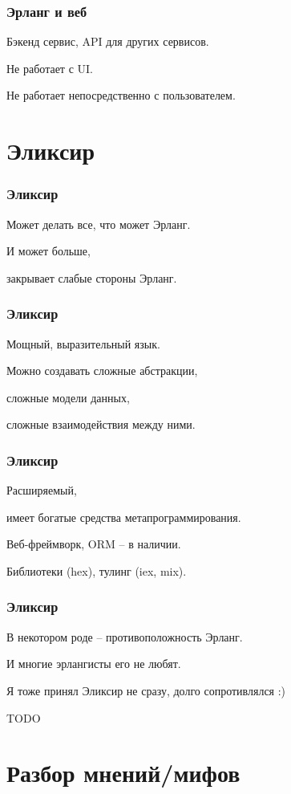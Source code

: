 \documentclass[10pt]{beamer}
\begin{document}
\begin{frame}
\frametitle{Эрланг и веб}
\centering
Бэкенд сервис, API для других сервисов.
\par \bigskip
Не работает с UI.
\par \bigskip
Не работает непосредственно с пользователем.
\end{frame}


\section{Эликсир}

\begin{frame}
\frametitle{Эликсир}
\centering
Может делать все, что может Эрланг.
\par \bigskip
И может больше,
\par
закрывает слабые стороны Эрланг.
\end{frame}

\begin{frame}
\frametitle{Эликсир}
\centering
Мощный, выразительный язык.
\par \bigskip
Можно создавать сложные абстракции,
\par
сложные модели данных,
\par
сложные взаимодействия между ними.
\end{frame}

\begin{frame}
\frametitle{Эликсир}
\centering
Расширяемый,
\par
имеет богатые средства метапрограммирования.
\par \bigskip
Веб-фреймворк, ORM -- в наличии.
\par \bigskip
Библиотеки (hex), тулинг (iex, mix).
\end{frame}

\begin{frame}
\frametitle{Эликсир}
\centering
В некотором роде -- противоположность Эрланг.
\par \bigskip
И многие эрлангисты его не любят.
\par \bigskip
Я тоже принял Эликсир не сразу, долго сопротивлялся :)
\end{frame}


\iffalse TODO


\section{Разбор мнений/мифов}

\begin{frame}
\frametitle{}
\centering
\par \bigskip
\end{frame}
\end{document}
